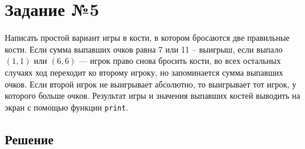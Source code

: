 \documentclass[12pt]{report}
\begin{document}
\section*{Задание №5}
Написать простой вариант игры в кости, в котором бросаются две правильные кости. Если сумма выпавших очков равна 7 или 11 -- выигрыш, если выпало $(1,1)$ или $(6,6)$ --- игрок право снова бросить кости, во всех остальных случаях ход переходит ко второму игроку, но запоминается сумма выпавших очков. Если второй игрок не выигрывает абсолютно, то выигрывает тот игрок, у которого больше очков. Результат игры и значения выпавших костей выводить на экран с помощью функции \texttt{print}.

\subsection*{Решение}
\end{document}

